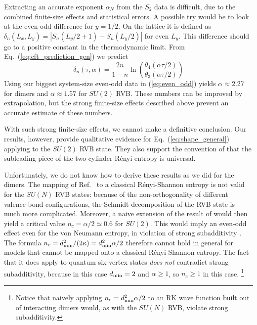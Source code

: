 \documentclass[11pt]{iopart}
\begin{document}
Extracting an accurate exponent $\alpha_N$ from the $S_2$ data is difficult, due to the combined finite-size effects and statistical errors. A possible try would be to  look at the even-odd difference for $y=1/2$. On the lattice it is defined as $\delta_n(L_x,L_y)=\left|S_n(L_y/2+1)-S_n(L_y/2)\right|$ for even $L_y$. This difference should go to a positive constant in the thermodynamic limit. From Eq.~(\ref{eq:cft_prediction_gen}) we predict
\begin{equation}\label{eq:even_odd}
 \delta_n(\tau,\alpha)=\frac{2n}{1-n}\ln \left(\frac{\theta_4(\alpha\tau/2)}{\theta_3(\alpha \tau/2)}\right)
\end{equation}
Using our biggest system-size even-odd data in (\ref{eq:even_odd}) yields $\alpha \approx 2.27$ for dimers and $\alpha \approx 1.57$ for $SU(2)$ RVB. These numbers can be improved by extrapolation, but the strong finite-size effects described above prevent an accurate estimate of these numbers.


With such strong finite-size effects, we cannot make a definitive conclusion. Our results, however, provide qualitative evidence for  Eq.~(\ref{eq:shape_general}) applying to the $SU(2)$ RVB state. They also support the convention of \cite{Ju2012} that the subleading piece of the two-cylinder R\'enyi entropy is universal.


Unfortunately, we do not know how to derive these results as we did for the dimers. The mapping of Ref.~\cite{Shannonee} to a classical R\'enyi-Shannon entropy is not valid for the $SU(N)$ RVB states: because of the non-orthogonality of different valence-bond configurations, the Schmidt decomposition of the RVB state is much more complicated.  Moreover, a naive extension of the result of \cite{Stephan2011} would then yield a critical value $ n_c=\alpha/2\simeq 0.6$  for $SU(2)$. This would imply an even-odd effect even for the von Neumann entropy, in violation of strong subadditivity \cite{Strongsubadditivity}. The formula $n_c=d_{\rm min }^2/(2\kappa)=d_{\rm min}^2\alpha/2$ therefore cannot hold in general for models that cannot be mapped onto a classical R\'enyi-Shannon entropy. The fact that it does apply to quantum six-vertex states \emph{does not} 
contradict strong subadditivity, because in this case $d_{\rm min}=2$ and $\alpha \geq 1$, so $n_c\geq 1$ in this case. \footnote{Notice that naively  applying $n_c=d_{\rm min}^2 \alpha/2$ to an RK wave function built out of interacting dimers \cite{Alet_dimers1,Alet_dimers2} would, as with the $SU(N)$ RVB, violate strong subadditivity.} 
\end{document}
